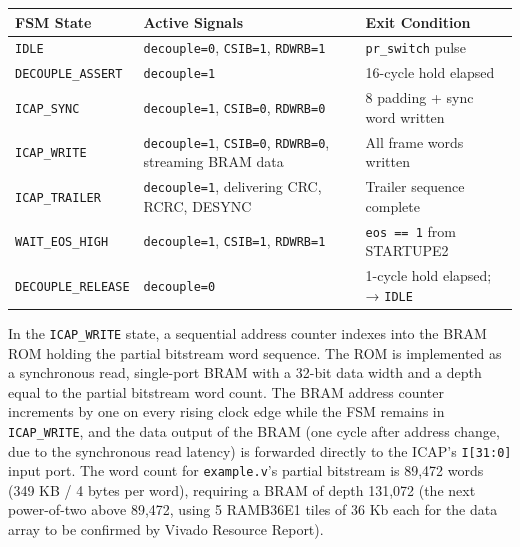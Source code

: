 \begin{table}[htbp]
\centering
\begin{tabularx}{\textwidth}{X X X}
\toprule
FSM State & Active Signals & Exit Condition \\
\midrule
\texttt{IDLE} & \texttt{decouple=0}, \texttt{CSIB=1}, \texttt{RDWRB=1} & \texttt{pr\_switch} pulse \\
\texttt{DECOUPLE\_ASSERT} & \texttt{decouple=1} & 16-cycle hold elapsed \\
\texttt{ICAP\_SYNC} & \texttt{decouple=1}, \texttt{CSIB=0}, \texttt{RDWRB=0} & 8 padding + sync word written \\
\texttt{ICAP\_WRITE} & \texttt{decouple=1}, \texttt{CSIB=0}, \texttt{RDWRB=0}, streaming BRAM data & All frame words written \\
\texttt{ICAP\_TRAILER} & \texttt{decouple=1}, delivering CRC, RCRC, DESYNC & Trailer sequence complete \\
\texttt{WAIT\_EOS\_HIGH} & \texttt{decouple=1}, \texttt{CSIB=1}, \texttt{RDWRB=1} & \texttt{eos == 1} from STARTUPE2 \\
\texttt{DECOUPLE\_RELEASE} & \texttt{decouple=0} & 1-cycle hold elapsed; → \texttt{IDLE} \\
\bottomrule
\end{tabularx}
\end{table}

In the \texttt{ICAP\_WRITE} state, a sequential address counter indexes into the BRAM ROM holding the partial bitstream word sequence. The ROM is implemented as a synchronous read, single-port BRAM with a 32-bit data width and a depth equal to the partial bitstream word count. The BRAM address counter increments by one on every rising clock edge while the FSM remains in \texttt{ICAP\_WRITE}, and the data output of the BRAM (one cycle after address change, due to the synchronous read latency) is forwarded directly to the ICAP's \texttt{I[31:0]} input port. The word count for \texttt{example.v}'s partial bitstream is 89,472 words (349 KB / 4 bytes per word), requiring a BRAM of depth 131,072 (the next power-of-two above 89,472, using 5 RAMB36E1 tiles of 36 Kb each for the data array to be confirmed by Vivado Resource Report).

